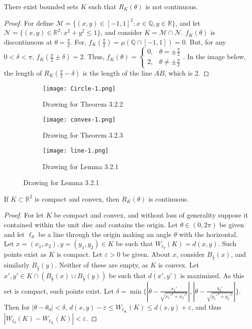 \documentclass[crop=false,class=book]{standalone}
\begin{document}
\begin{theorem}
There exist bounded sets $K$ such that $R_K(\theta)$ is not continuous.
\end{theorem}
\begin{proof}
For define $\mathcal{M} = \{(x,y)\in [-1,1]^2: x\in \mathbb{Q},y\in \mathbb{R}\}$, and let $\mathcal{N} = \{(x,y)\in \mathbb{R}^2: x^2+y^2\leq 1\}$, and consider $K = \mathcal{M}\cap \mathcal{N}$. $f_{K}(\theta)$ is discontinuous at $\theta = \frac{\pi}{2}$. For, $f_K(\frac{\pi}{2}) = \mu(\mathbb{Q}\cap [-1,1])=0$. But, for any $0<\delta < \pi$, $f_K(\frac{\pi}{2}\pm\delta) = 2$. Thus, $f_K(\theta) = \begin{cases} 0, & \theta = \pm \frac{\pi}{2} \\ 2, & \theta \ne \pm \frac{\pi}{2}\end{cases}$. In the image below, the length of $R_K(\frac{\pi}{2}-\delta)$ is the length of the line $\overline{AB}$, which is 2.
\end{proof}
\begin{figure}[H]
  \begin{subfigure}[b]{0.32\textwidth}
     \centering
    \texttt{[image: Circle-1.png]}
    \caption{Drawing for Theorem 3.2.2}
  \end{subfigure}
  \begin{subfigure}[b]{0.32\textwidth}
    \centering
    \texttt{[image: convex-1.png]}
    \caption{Drawing for Theorem 3.2.3}
  \end{subfigure}
  \begin{subfigure}[b]{0.32\textwidth}
    \centering
    \texttt{[image: line-1.png]}
    \caption{Drawing for Lemma 3.2.1}
  \end{subfigure}  
\end{figure}
\begin{theorem}
If $K\subset \mathbb{R}^2$ is compact and convex, then $R_K(\theta)$ is continuous.
\end{theorem}
\begin{proof}
For let $K$ be compact and convex, and without loss of generality suppose it contained within the unit disc and contains the origin. Let $\theta\in (0,2\pi)$ be given and let $\ell_{\theta}$ be a line through the origin making an angle $\theta$ with the horizontal. Let $x=(x_1,x_2),y=(y_1,y_2)\in K$ be such that $W_{\ell_{\theta}}(K) = d(x,y)$. Such points exist as $K$ is compact. Let $\varepsilon>0$ be given. About $x$, consider $B_{\frac{\varepsilon}{2}}(x)$, and similarly $B_{\frac{\varepsilon}{2}}(y)$. Neither of these are empty, as $K$ is convex. Let $x',y'\in K\cap(B_{\frac{\varepsilon}{2}}(x)\cup B_{\frac{\varepsilon}{2}}(y))$ be such that $d(x',y')$ is maximized. As this set is compact, such points exist. Let $\delta = \min\{|\theta-\frac{x_2'}{\sqrt{x_1'^2+x_2'^2}}|,|\theta-\frac{y_2'}{\sqrt{y_1'^2+y_2'^2}}|\}$. Then for $|\theta-\theta_0|<\delta$, $d(x,y)-\varepsilon \leq W_{\ell_{\theta_0}}(K)\leq d(x,y)+\varepsilon$, and thus $|W_{\ell_\theta}(K)-W_{\ell_{\theta_0}}(K)| < \varepsilon$.
\end{proof}
\end{document}
